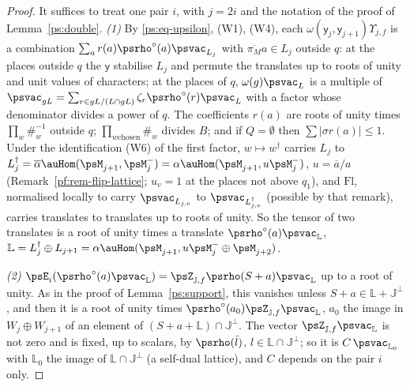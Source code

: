 \documentclass[10pt]{amsart}
\theoremstyle{definition}
\theoremstyle{remark}
\providecommand{\aubar}[1]{\overline{#1}}
\begin{document}
\begin{proof}
It suffices to treat one pair $i$, with $j=2i$ and the notation of the proof of
Lemma~\ref{ps:double}. \emph{(1)} By \eqref{ps:eq-upsilon}, (W1), (W4), each
$\omega(\mathsf y_j,\mathsf y_{j+1})\Upsilon_{j,f}$ is a combination $\sum_ar(a)\psrho^\circ(a)
\psvac_{L_j}$ with $\aubar{\pi_M}a\in L_j$ outside $q$: at the places outside $q$ the $\mathsf y$
stabilise $L_j$ and permute the translates up to roots of unity and unit values of characters; at
the places of $q$, $\omega(g)\psvac_L$ is a multiple of $\psvac_{gL}=\sum_{r\in gL/(L\cap gL)}
\zeta_r\psrho^\circ(r)\psvac_L$ with a factor whose denominator divides a power of $q$. The
coefficients $r(a)$ are roots of unity times $\prod_w\#_w^{-1}$ outside $q$; $\prod_{w\text{
chosen}}\#_w$ divides $B$; and if $Q=\emptyset$ then $\sum|\sigma r(a)|\le1$. Under the
identification (W6) of the first factor, $w\mapsto w^\dagger$ carries $L_j$ to
$L_j^\dagger=\aubar\alpha\auHom(\psM_{j+1},\psM_j^-)=\alpha\auHom(\psM_{j+1},u\psM_j^-)$, $u=\aubar a/a$
(Remark~\ref{pf:rem-flip-lattice}; $u_v=1$ at the places not above $q_1$), and $\mathrm{Fl}$, normalised
locally to carry $\psvac_{L_{j,v}}$ to $\psvac_{L^\dagger_{j,v}}$ (possible by that remark), carries
translates to translates up to roots of unity. So the tensor of two translates is a root of unity
times a translate $\psrho^\circ(a)\psvac_{\mathbb L}$,
$\mathbb L=L_j^\dagger\oplus L_{j+1}=\alpha\auHom(\psM_{j+1},u\psM_j^-\oplus\psM_{j+2})$.

\emph{(2)} $\psE_i(\psrho^\circ(a)\psvac_{\mathbb L})=\psZ_{\mathbb J,f}\psrho(S+a)\psvac_{\mathbb L}$
up to a root of unity. As in the proof of Lemma~\ref{ps:support}, this vanishes unless
$S+a\in\mathbb L+\mathbb J^\perp$, and then it is a root of unity times
$\psrho^\circ(a_0)\psZ_{\mathbb J,f}\psvac_{\mathbb L}$, $a_0$ the image in $W_j\oplus W_{j+1}$ of
an element of $(S+a+\mathbb L)\cap\mathbb J^\perp$. The vector $\psZ_{\mathbb J,f}\psvac_{\mathbb L}$
is not zero and is fixed, up to scalars, by $\psrho(\bar l)$, $l\in\mathbb L\cap\mathbb J^\perp$; so
it is $C\,\psvac_{\mathbb L_0}$ with $\mathbb L_0$ the image of $\mathbb L\cap\mathbb J^\perp$ (a
self-dual lattice), and $C$ depends on the pair $i$ only.


\end{proof}
\end{document}
